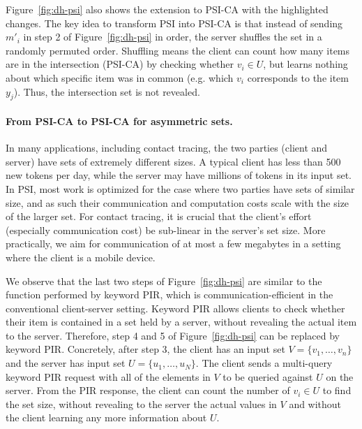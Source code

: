 \documentclass[11pt]{article} %
\newcommand{\figureref}[1]{Figure~\ref{#1}}
\begin{document}
\figureref{fig:dh-psi} also shows the extension to PSI-CA with the highlighted changes. The key idea to transform PSI into PSI-CA is that instead of sending $m'_i$ in step 2 of \figureref{fig:dh-psi} in order, the server shuffles the set in a randomly permuted order.  Shuffling means the client can count how many items are in the intersection (PSI-CA) by checking whether  $v_i \in U$, but learns nothing about which specific item was in common (e.g. which $v_i$ corresponds to the item $y_j$). Thus, the intersection set is not revealed.

\paragraph{From PSI-CA to PSI-CA for asymmetric sets.}

In many applications, including contact tracing, the two parties (client and server) have sets of extremely different sizes. A typical client has less than 500 new tokens per day, while the server may
have millions of tokens in its input set. In PSI, most work is optimized for the case where two parties have sets of similar size, and as such their communication and computation costs scale with the size of the larger set. For contact tracing, it is crucial that the client's effort (especially communication cost) be sub-linear in the server's set size. More practically, we aim for communication of at most a few megabytes in a setting where the client is a mobile device. 

We observe that the last two steps of \figureref{fig:dh-psi} are similar to the function performed by keyword PIR, which is communication-efficient in the conventional client-server setting. Keyword PIR allows clients to check whether their item is contained in a set held by a server, without revealing the actual item to the server. Therefore, step 4 and 5 of \figureref{fig:dh-psi} can be replaced by keyword PIR. Concretely, after step 3, the client has an input set $V=\{v_1, \ldots, v_n\}$ and the server has input set $U=\{u_1, \ldots, u_N\}$. The client sends a multi-query keyword PIR request with all of the elements in $V$ to be queried against $U$ on the server. From the PIR response, the client can count the number of $v_i \in U$ to find the set size, without revealing to the server the actual values in $V$ and without the client learning any more information about $U$.
\end{document}
